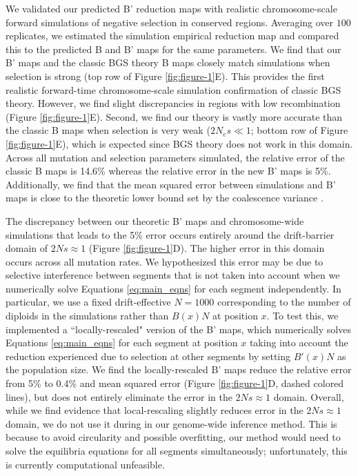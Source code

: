 \documentclass[11pt]{article}
\begin{document}
We validated our predicted B' reduction maps with realistic chromosome-scale
forward simulations of negative selection in conserved regions. Averaging over
$100$ replicates, we estimated the simulation empirical reduction map and
compared this to the predicted B and B' maps for the same parameters. We find
that our B' maps and the classic BGS theory B maps closely match simulations
when selection is strong (top row of Figure \ref{fig:figure-1}E). This provides
the first realistic forward-time chromosome-scale simulation confirmation of
classic BGS theory. However, we find slight discrepancies in regions with low
recombination (Figure \ref{fig:figure-1}E). Second, we find our theory is
vastly more accurate than the classic B maps when selection is very weak ($2N_e
s \ll 1$; bottom row of Figure \ref{fig:figure-1}E), which is expected since
BGS theory does not work in this domain. Across all mutation and selection
parameters simulated, the relative error of the classic B maps is 14.6\%
whereas the relative error in the new B' maps is 5\%. Additionally, we find
that the mean squared error between simulations and B' maps is close to the
theoretic lower bound set by the coalescence variance
\parencite{Tajima1983-gu}.

The discrepancy between our theoretic B' maps and chromosome-wide simulations
that leads to the 5\% error occurs entirely around the drift-barrier domain of
$2Ns \approx 1$ (Figure \ref{fig:figure-1}D). The higher error in this domain
occurs across all mutation rates. We hypothesized this error may be due to
selective interference between segments that is not taken into account when we
numerically solve Equations \eqref{eq:main_eqns} for each segment
independently. In particular, we use a fixed drift-effective $N=1000$
corresponding to the number of diploids in the simulations rather than $B(x) N$
at position $x$. To test this, we implemented a ``locally-rescaled" version of
the B' maps, which numerically solves Equations \eqref{eq:main_eqns} for each
segment at position $x$ taking into account the reduction experienced due to
selection at other segments by setting $B'(x)N$ as the population size. We find
the locally-rescaled B' maps reduce the relative error from 5\% to 0.4\% and
mean squared error (Figure \ref{fig:figure-1}D, dashed colored lines), but does
not entirely eliminate the error in the $2Ns \approx 1$ domain. Overall, while
we find evidence that local-rescaling slightly reduces error in the $2Ns
\approx 1$ domain, we do not use it during in our genome-wide inference method.
This is because to avoid circularity and possible overfitting, our method would
need to solve the equilibria equations for all segments simultaneously;
unfortunately, this is currently computational unfeasible.
\end{document}
